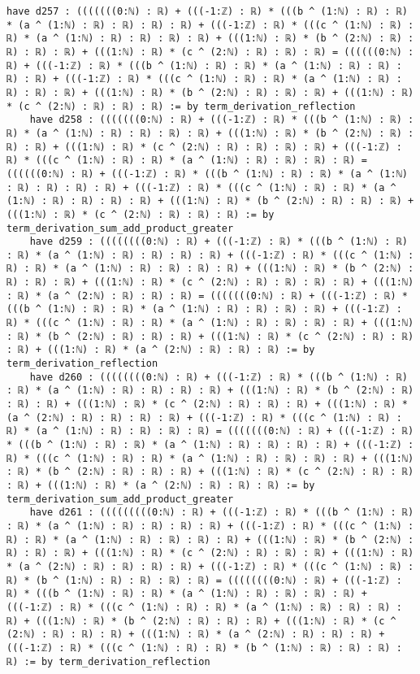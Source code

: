 \documentclass{article}
\begin{document}
\begin{tcolorbox}[colback=white!10, width=\linewidth]
\begin{lstlisting}[language=Lean4]
    have d257 : (((((((0:ℕ) : ℝ) + (((-1:ℤ) : ℝ) * (((b ^ (1:ℕ) : ℝ) : ℝ) * (a ^ (1:ℕ) : ℝ) : ℝ) : ℝ) : ℝ) + (((-1:ℤ) : ℝ) * (((c ^ (1:ℕ) : ℝ) : ℝ) * (a ^ (1:ℕ) : ℝ) : ℝ) : ℝ) : ℝ) + (((1:ℕ) : ℝ) * (b ^ (2:ℕ) : ℝ) : ℝ) : ℝ) : ℝ) + (((1:ℕ) : ℝ) * (c ^ (2:ℕ) : ℝ) : ℝ) : ℝ) = ((((((0:ℕ) : ℝ) + (((-1:ℤ) : ℝ) * (((b ^ (1:ℕ) : ℝ) : ℝ) * (a ^ (1:ℕ) : ℝ) : ℝ) : ℝ) : ℝ) + (((-1:ℤ) : ℝ) * (((c ^ (1:ℕ) : ℝ) : ℝ) * (a ^ (1:ℕ) : ℝ) : ℝ) : ℝ) : ℝ) + (((1:ℕ) : ℝ) * (b ^ (2:ℕ) : ℝ) : ℝ) : ℝ) + (((1:ℕ) : ℝ) * (c ^ (2:ℕ) : ℝ) : ℝ) : ℝ) := by term_derivation_reflection
    have d258 : (((((((0:ℕ) : ℝ) + (((-1:ℤ) : ℝ) * (((b ^ (1:ℕ) : ℝ) : ℝ) * (a ^ (1:ℕ) : ℝ) : ℝ) : ℝ) : ℝ) + (((1:ℕ) : ℝ) * (b ^ (2:ℕ) : ℝ) : ℝ) : ℝ) + (((1:ℕ) : ℝ) * (c ^ (2:ℕ) : ℝ) : ℝ) : ℝ) : ℝ) + (((-1:ℤ) : ℝ) * (((c ^ (1:ℕ) : ℝ) : ℝ) * (a ^ (1:ℕ) : ℝ) : ℝ) : ℝ) : ℝ) = ((((((0:ℕ) : ℝ) + (((-1:ℤ) : ℝ) * (((b ^ (1:ℕ) : ℝ) : ℝ) * (a ^ (1:ℕ) : ℝ) : ℝ) : ℝ) : ℝ) + (((-1:ℤ) : ℝ) * (((c ^ (1:ℕ) : ℝ) : ℝ) * (a ^ (1:ℕ) : ℝ) : ℝ) : ℝ) : ℝ) + (((1:ℕ) : ℝ) * (b ^ (2:ℕ) : ℝ) : ℝ) : ℝ) + (((1:ℕ) : ℝ) * (c ^ (2:ℕ) : ℝ) : ℝ) : ℝ) := by term_derivation_sum_add_product_greater
    have d259 : ((((((((0:ℕ) : ℝ) + (((-1:ℤ) : ℝ) * (((b ^ (1:ℕ) : ℝ) : ℝ) * (a ^ (1:ℕ) : ℝ) : ℝ) : ℝ) : ℝ) + (((-1:ℤ) : ℝ) * (((c ^ (1:ℕ) : ℝ) : ℝ) * (a ^ (1:ℕ) : ℝ) : ℝ) : ℝ) : ℝ) + (((1:ℕ) : ℝ) * (b ^ (2:ℕ) : ℝ) : ℝ) : ℝ) + (((1:ℕ) : ℝ) * (c ^ (2:ℕ) : ℝ) : ℝ) : ℝ) : ℝ) + (((1:ℕ) : ℝ) * (a ^ (2:ℕ) : ℝ) : ℝ) : ℝ) = (((((((0:ℕ) : ℝ) + (((-1:ℤ) : ℝ) * (((b ^ (1:ℕ) : ℝ) : ℝ) * (a ^ (1:ℕ) : ℝ) : ℝ) : ℝ) : ℝ) + (((-1:ℤ) : ℝ) * (((c ^ (1:ℕ) : ℝ) : ℝ) * (a ^ (1:ℕ) : ℝ) : ℝ) : ℝ) : ℝ) + (((1:ℕ) : ℝ) * (b ^ (2:ℕ) : ℝ) : ℝ) : ℝ) + (((1:ℕ) : ℝ) * (c ^ (2:ℕ) : ℝ) : ℝ) : ℝ) + (((1:ℕ) : ℝ) * (a ^ (2:ℕ) : ℝ) : ℝ) : ℝ) := by term_derivation_reflection
    have d260 : ((((((((0:ℕ) : ℝ) + (((-1:ℤ) : ℝ) * (((b ^ (1:ℕ) : ℝ) : ℝ) * (a ^ (1:ℕ) : ℝ) : ℝ) : ℝ) : ℝ) + (((1:ℕ) : ℝ) * (b ^ (2:ℕ) : ℝ) : ℝ) : ℝ) + (((1:ℕ) : ℝ) * (c ^ (2:ℕ) : ℝ) : ℝ) : ℝ) + (((1:ℕ) : ℝ) * (a ^ (2:ℕ) : ℝ) : ℝ) : ℝ) : ℝ) + (((-1:ℤ) : ℝ) * (((c ^ (1:ℕ) : ℝ) : ℝ) * (a ^ (1:ℕ) : ℝ) : ℝ) : ℝ) : ℝ) = (((((((0:ℕ) : ℝ) + (((-1:ℤ) : ℝ) * (((b ^ (1:ℕ) : ℝ) : ℝ) * (a ^ (1:ℕ) : ℝ) : ℝ) : ℝ) : ℝ) + (((-1:ℤ) : ℝ) * (((c ^ (1:ℕ) : ℝ) : ℝ) * (a ^ (1:ℕ) : ℝ) : ℝ) : ℝ) : ℝ) + (((1:ℕ) : ℝ) * (b ^ (2:ℕ) : ℝ) : ℝ) : ℝ) + (((1:ℕ) : ℝ) * (c ^ (2:ℕ) : ℝ) : ℝ) : ℝ) + (((1:ℕ) : ℝ) * (a ^ (2:ℕ) : ℝ) : ℝ) : ℝ) := by term_derivation_sum_add_product_greater
    have d261 : (((((((((0:ℕ) : ℝ) + (((-1:ℤ) : ℝ) * (((b ^ (1:ℕ) : ℝ) : ℝ) * (a ^ (1:ℕ) : ℝ) : ℝ) : ℝ) : ℝ) + (((-1:ℤ) : ℝ) * (((c ^ (1:ℕ) : ℝ) : ℝ) * (a ^ (1:ℕ) : ℝ) : ℝ) : ℝ) : ℝ) + (((1:ℕ) : ℝ) * (b ^ (2:ℕ) : ℝ) : ℝ) : ℝ) + (((1:ℕ) : ℝ) * (c ^ (2:ℕ) : ℝ) : ℝ) : ℝ) + (((1:ℕ) : ℝ) * (a ^ (2:ℕ) : ℝ) : ℝ) : ℝ) : ℝ) + (((-1:ℤ) : ℝ) * (((c ^ (1:ℕ) : ℝ) : ℝ) * (b ^ (1:ℕ) : ℝ) : ℝ) : ℝ) : ℝ) = ((((((((0:ℕ) : ℝ) + (((-1:ℤ) : ℝ) * (((b ^ (1:ℕ) : ℝ) : ℝ) * (a ^ (1:ℕ) : ℝ) : ℝ) : ℝ) : ℝ) + (((-1:ℤ) : ℝ) * (((c ^ (1:ℕ) : ℝ) : ℝ) * (a ^ (1:ℕ) : ℝ) : ℝ) : ℝ) : ℝ) + (((1:ℕ) : ℝ) * (b ^ (2:ℕ) : ℝ) : ℝ) : ℝ) + (((1:ℕ) : ℝ) * (c ^ (2:ℕ) : ℝ) : ℝ) : ℝ) + (((1:ℕ) : ℝ) * (a ^ (2:ℕ) : ℝ) : ℝ) : ℝ) + (((-1:ℤ) : ℝ) * (((c ^ (1:ℕ) : ℝ) : ℝ) * (b ^ (1:ℕ) : ℝ) : ℝ) : ℝ) : ℝ) := by term_derivation_reflection

\end{lstlisting}
\end{tcolorbox}
\end{document}
